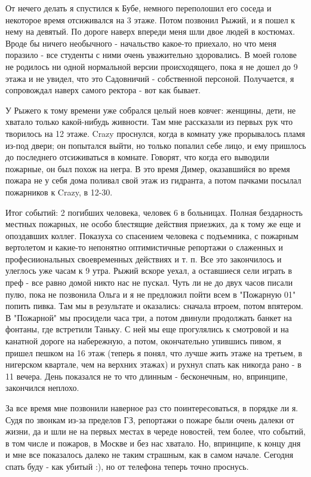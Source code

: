 \documentclass[12pt,a4paper]{article}
\begin{document}
От нечего делать я спустился к Бубе, немного переполошил его соседа и некоторое время отсиживался на 3 этаже. Потом позвонил Рыжий, и я пошел к нему на девятый. По дороге наверх впереди меня шли двое людей в костюмах. Вроде бы ничего необычного - начальство какое-то приехало, но что меня поразило - все студенты с ними очень уважительно здоровались. В моей голове не родилось ни одной нормальной версии происходящего, пока я не дошел до 9 этажа и не увидел, что это Садовничий - собственной персоной. Получается, я сопровождал наверх самого ректора - вот как бывает.

 У Рыжего к тому времени уже собрался целый ноев ковчег: женщины, дети, не хватало только какой-нибудь живности. Там мне рассказали из первых рук что творилось на 12 этаже. Crazy проснулся, когда в комнату уже прорывалось пламя из-под двери; он попытался выйти, но только попалил себе лицо, и ему пришлось до последнего отсиживаться в комнате. Говорят, что когда его выводили пожарные, он был похож на негра. В это время Димер, оказавшийся во время пожара не у себя дома поливал свой этаж из гидранта, а потом пачками посылал пожарников к Crazy, в 12-30. 

Итог событий: 2 погибших человека, человек 6 в больницах. Полная бездарность местных пожарных, не особо блестящие действия приезжих, да к тому же еще и опоздавших коллег. Показуха со спасением человека с подъемника, с пожарным вертолетом и какие-то непонятно оптимистичные репортажи о слаженных и професииональных своевременных действиях и т. п. Все это закончилось и улеглось уже часам к 9 утра. Рыжий вскоре уехал, а оставшиеся сели играть в преф - все равно домой никто нас не пускал. Чуть ли не до двух часов писали пулю, пока не позвонила Ольга и я не предложил пойти всем в "Пожарную 01" попить пивка. Там мы в результате и оказались: сначала втроем, потом впятером. В "Пожарной" мы просидели часа три, а потом двинули продолжать банкет на фонтаны, где встретили Таньку. С ней мы еще прогулялись к смотровой и на канатной дороге на набережную, а потом, окончательно упившись пивом, я пришел пешком на 16 этаж (теперь я понял, что лучше жить этаже на третьем, в нигерском квартале, чем на верхних этажах) и рухнул спать как никогда рано - в 11 вечера. День показался не то что длинным - бесконечным, но, впринципе, закончился неплохо.

За все время мне позвонили наверное раз сто поинтересоваться, в порядке ли я. Судя по звонкам из-за пределов ГЗ, репортажи о пожаре были очень далеки от жизни, да и шли не на первых местах в череде новостей, тем более, что событий, в том числе и пожаров, в Москве и без нас хватало. Но, впринципе, к концу дня и мне все показалось далеко не таким страшным, как в самом начале. Сегодня спать буду - как убитый :), но от телефона теперь точно проснусь.
\end{document}
